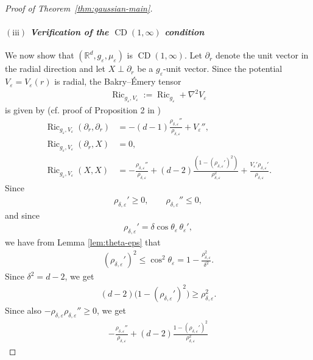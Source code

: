 \documentclass[11pt,reqno]{amsart}
\numberwithin{equation}{section}
\theoremstyle{definition}
\theoremstyle{remark}
\newcommand{\te}{\theta}
\newcommand{\0}{\emptyset}
\newcommand{\veps}{\varepsilon}
\newcommand{\bbR}{\mathbb R}
\newcommand{\Ric}{\operatorname{Ric}}
\newcommand{\CD}{\operatorname{CD}}
\begin{document}
\begin{proof}[Proof of Theorem~\ref{thm:gaussian-main}]
\paragraph{$\mathrm{(iii)}$ \textit{Verification of the $\CD(1,\infty)$ condition}} We now show that \((\bbR^d,g_\veps,\mu_\veps)\) is \(\CD(1,\infty)\). Let
\(\partial_r\) denote the unit vector in the radial direction and let
\(X\perp\partial_r\) be a \(g_\veps\)-unit vector. Since the potential
\(V_\veps=V_\veps(r)\) is radial, the Bakry--\'Emery tensor
\begin{align}
        \Ric_{g_\veps,V_\veps}:=\Ric_{g_\veps}+\nabla^2V_\veps
\end{align}
is given by (cf. proof of Proposition 2 in \cite{wylie2016some})
\begin{align}
        \Ric_{g_\veps,V_\veps}(\partial_r,\partial_r)
        &=
        -(d-1)\frac{\rho_{\delta,\veps}''}{\rho_{\delta,\veps}}
        +
        V_\veps'',\\
        \Ric_{g_\veps,V_\veps}(\partial_r,X)
        &=
        0,\\
        \Ric_{g_\veps,V_\veps}(X,X)
        &=
        -\frac{\rho_{\delta,\veps}''}{\rho_{\delta,\veps}}
        +
        (d-2)\frac{(1-(\rho_{\delta,\veps}')^2)}{\rho_{\delta,\veps}^2}
        +
        \frac{V_\veps'\rho_{\delta,\veps}'}{\rho_{\delta,\veps}}.
\end{align}
Since
\begin{align}
        \rho_{\delta,\veps}'\geq0,
        \qquad
        \rho_{\delta,\veps}''\leq0,
\end{align}
and since
\begin{align}
        \rho_{\delta,\veps}'
        =
        \delta\cos\te_\veps\,\te_\veps',
\end{align}
we have from Lemma \ref{lem:theta-eps} that
\begin{align}
        (\rho_{\delta,\veps}')^2
        \leq
        \cos^2\te_\veps
        =
        1-\frac{\rho_{\delta,\veps}^2}{\delta^2}.
\end{align}
Since \(\delta^2=d-2\), we get
\begin{align}
        (d-2)\bigl(1-(\rho_{\delta,\veps}')^2\bigr)
        \geq
        \rho_{\delta,\veps}^2.
\end{align}
Since also \(-\rho_{\delta,\veps}\rho_{\delta,\veps}''\geq0\), we get
\begin{align}
        -\frac{\rho_{\delta,\veps}''}{\rho_{\delta,\veps}}
        +
        (d-2)\frac{1-(\rho_{\delta,\veps}')^2}{\rho_{\delta,\veps}^2}

\end{align}
\end{proof}
\end{document}
